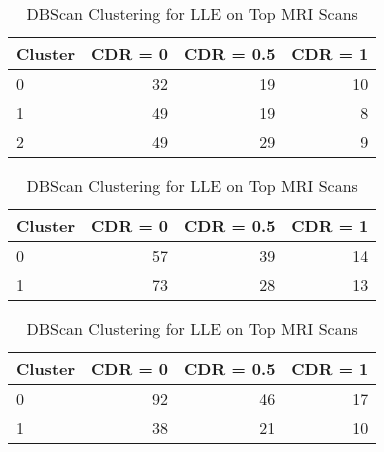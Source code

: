 \begin{table}[h] \centering
\begin{minipage}{0.3\textwidth}

\begin{tabular}{lrrr}
\toprule
Cluster & CDR = 0 & CDR = 0.5 & CDR = 1\\
\midrule
0 & 32 & 19 & 10\\
1 & 49 & 19 & 8\\
2 & 49 & 29 & 9\\
\bottomrule
\end{tabular}
\caption{Kmeans Clustering with 3 Clusters for LLE on Top MRI Scans}
\end{minipage}
\hspace{3cm}
\begin{minipage}{0.3\textwidth}

\begin{tabular}{lrrr}
\toprule
Cluster & CDR = 0 & CDR = 0.5 & CDR = 1\\
\midrule
0 & 57 & 39 & 14\\
1 & 73 & 28 & 13\\
\bottomrule
\end{tabular}
\caption{Kmeans Clustering with 2 Clusters for LLE on Top MRI Scans}
\end{minipage}
\hspace{3cm}
\begin{minipage}{0.3\textwidth}

\begin{tabular}{lrrr}
\toprule
Cluster & CDR = 0 & CDR = 0.5 & CDR = 1\\
\midrule
0 & 92 & 46 & 17\\
1 & 38 & 21 & 10\\
\bottomrule
\end{tabular}
\caption{DBScan Clustering for LLE on Top MRI Scans}
\end{minipage}
\end{table}
